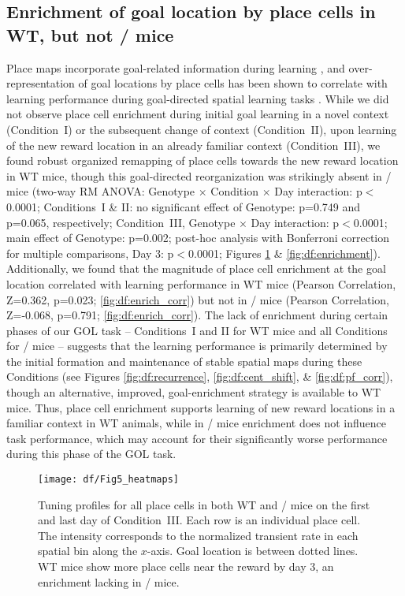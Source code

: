 \subsection{Enrichment of goal location by place cells in WT, but not \df/ mice}
\label{sec:df:results:enrichment}
Place maps incorporate goal-related information during learning \citep{Breese1989, Dupret2010b, Fyhn2002, Gothard1996, Hok2007, Hollup2001b, Kobayashi1997}, and over-representation of goal locations by place cells has been shown to correlate with learning performance during goal-directed spatial learning tasks \citep{Dupret2010a, Hollup2001b}.  While we did not observe place cell enrichment during initial goal learning in a novel context (Condition~I) or the subsequent change of context (Condition~II), upon learning of the new reward location in an already familiar context (Condition~III), we found robust organized remapping of place cells towards the new reward location in WT mice, though this goal-directed reorganization was strikingly absent in \df/ mice (two-way RM ANOVA: Genotype $\times$ Condition $\times$ Day interaction: p$<$0.0001; Conditions~I \& II: no significant effect of Genotype:  p=0.749 and p=0.065, respectively; Condition~III, Genotype $\times$ Day interaction: p$<$0.0001; main effect of Genotype: p=0.002; post-hoc analysis with Bonferroni correction for multiple comparisons, Day 3: p$<$0.0001; Figures \ref{fig:df:enrich_heatmaps} \& \ref{fig:df:enrichment}).  Additionally, we found that the magnitude of place cell enrichment at the goal location correlated with learning performance in WT mice (Pearson Correlation, Z=0.362, p=0.023; \autoref{fig:df:enrich_corr}) but not in \df/ mice (Pearson Correlation, Z=-0.068, p=0.791; \autoref{fig:df:enrich_corr}). The lack of enrichment during certain phases of our GOL task -- Conditions~I and II for WT mice and all Conditions for \df/ mice -- suggests that the learning performance is primarily determined by the initial formation and maintenance of stable spatial maps during these Conditions (see Figures \ref{fig:df:recurrence}, \ref{fig:df:cent_shift}, \& \ref{fig:df:pf_corr}), though an alternative, improved, goal-enrichment strategy is available to WT mice. Thus, place cell enrichment supports learning of new reward locations in a familiar context in WT animals, while in \df/ mice enrichment does not influence task performance, which may account for their significantly worse performance during this phase of the GOL task.

\begin{figure}
	\centering
	\texttt{[image: df/Fig5\_heatmaps]}
	\caption[Heatmaps of place cell population throughout Condition~III]{Tuning profiles for all place cells in both WT and \df/ mice on the first and last day of Condition~III.
	Each row is an individual place cell. The intensity corresponds to the normalized transient rate in each spatial bin along the $x$-axis. Goal location is between dotted lines.
	WT mice show more place cells near the reward by day 3, an enrichment lacking in \df/ mice.}
	\label{fig:df:enrich_heatmaps}
\end{figure}

